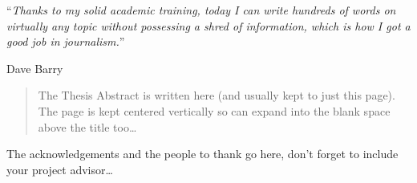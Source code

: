 \documentclass[
11pt, %
spanish, %
singlespacing, %
]{MastersDoctoralThesis} %
\begin{document}



\cleardoublepage


\vspace*{0.2\textheight}

\noindent\enquote{\itshape Thanks to my solid academic training, today I can write hundreds of words on virtually any topic without possessing a shred of information, which is how I got a good job in journalism.}\bigbreak

\hfill Dave Barry


\begin{abstract}
\addchaptertocentry{\abstractname} %

The Thesis Abstract is written here (and usually kept to just this page). The page is kept centered vertically so can expand into the blank space above the title too\ldots

\end{abstract}


\begin{acknowledgements}
\addchaptertocentry{\acknowledgementname} %

The acknowledgements and the people to thank go here, don't forget to include your project advisor\ldots

\end{acknowledgements}

\end{document}
